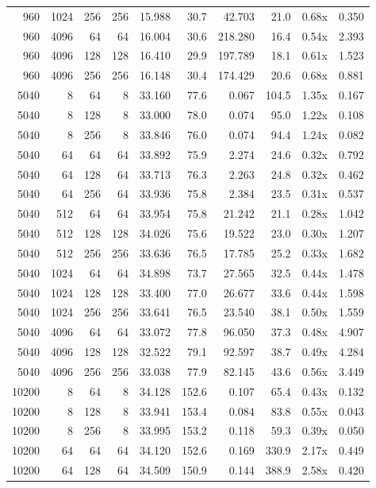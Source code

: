 {\begin{longtable}{rrrrrrrrrr}
960 & 1024 & 256 & 256 & 15.988 & 30.7 & 42.703 & 21.0 & 0.68x & 0.350\\
960 & 4096 & 64 & 64 & 16.004 & 30.6 & 218.280 & 16.4 & 0.54x & 2.393\\
960 & 4096 & 128 & 128 & 16.410 & 29.9 & 197.789 & 18.1 & 0.61x & 1.523\\
960 & 4096 & 256 & 256 & 16.148 & 30.4 & 174.429 & 20.6 & 0.68x & 0.881\\
5040 & 8 & 64 & 8 & 33.160 & 77.6 & 0.067 & 104.5 & 1.35x & 0.167\\
5040 & 8 & 128 & 8 & 33.000 & 78.0 & 0.074 & 95.0 & 1.22x & 0.108\\
5040 & 8 & 256 & 8 & 33.846 & 76.0 & 0.074 & 94.4 & 1.24x & 0.082\\
5040 & 64 & 64 & 64 & 33.892 & 75.9 & 2.274 & 24.6 & 0.32x & 0.792\\
5040 & 64 & 128 & 64 & 33.713 & 76.3 & 2.263 & 24.8 & 0.32x & 0.462\\
5040 & 64 & 256 & 64 & 33.936 & 75.8 & 2.384 & 23.5 & 0.31x & 0.537\\
5040 & 512 & 64 & 64 & 33.954 & 75.8 & 21.242 & 21.1 & 0.28x & 1.042\\
5040 & 512 & 128 & 128 & 34.026 & 75.6 & 19.522 & 23.0 & 0.30x & 1.207\\
5040 & 512 & 256 & 256 & 33.636 & 76.5 & 17.785 & 25.2 & 0.33x & 1.682\\
5040 & 1024 & 64 & 64 & 34.898 & 73.7 & 27.565 & 32.5 & 0.44x & 1.478\\
5040 & 1024 & 128 & 128 & 33.400 & 77.0 & 26.677 & 33.6 & 0.44x & 1.598\\
5040 & 1024 & 256 & 256 & 33.641 & 76.5 & 23.540 & 38.1 & 0.50x & 1.559\\
5040 & 4096 & 64 & 64 & 33.072 & 77.8 & 96.050 & 37.3 & 0.48x & 4.907\\
5040 & 4096 & 128 & 128 & 32.522 & 79.1 & 92.597 & 38.7 & 0.49x & 4.284\\
5040 & 4096 & 256 & 256 & 33.038 & 77.9 & 82.145 & 43.6 & 0.56x & 3.449\\
10200 & 8 & 64 & 8 & 34.128 & 152.6 & 0.107 & 65.4 & 0.43x & 0.132\\
10200 & 8 & 128 & 8 & 33.941 & 153.4 & 0.084 & 83.8 & 0.55x & 0.043\\
10200 & 8 & 256 & 8 & 33.995 & 153.2 & 0.118 & 59.3 & 0.39x & 0.050\\
10200 & 64 & 64 & 64 & 34.120 & 152.6 & 0.169 & 330.9 & 2.17x & 0.449\\
10200 & 64 & 128 & 64 & 34.509 & 150.9 & 0.144 & 388.9 & 2.58x & 0.420\\

\end{longtable}}
